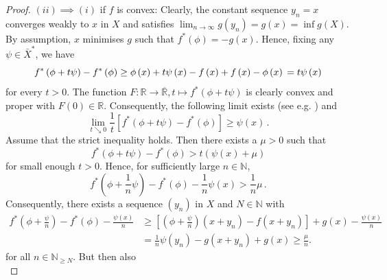 \documentclass[
	paper=A4,
	pagesize=auto,
	fontsize=12pt
]{scrartcl}
\theoremstyle{plain}
\theoremstyle{remark}
\theoremstyle{definition}
\begin{document}
\begin{proof}
$(ii) \implies (i)$ if $f$ is convex:
Clearly, the constant sequence $y_n = x$ converges weakly to $x$ in $X$ and satisfies $\lim_{n \to \infty} g(y_n) = g(x) = \inf g(X)$.
By assumption, $x$ minimises $g$ such that $f^*(\phi) = - g(x)$.
Hence, fixing any $\psi \in \bar{X}^*$, we have
%
\begin{equation}
f^* \left( \phi + t \psi \right) - f^* \left( \phi \right) 
\ge
\phi \left( x \right) + t \psi \left( x \right) - f \left( x \right) + f \left( x \right) - \phi \left( x \right) \\
=
t \psi \left( x \right)
\end{equation} 
%
for every $t>0$.
The function $F : \mathbb{R} \to \overline{\mathbb{R}}, t \mapsto f^* \left( \phi + t \psi \right)$ is clearly convex and proper with $F(0) \in \mathbb{R}$.
Consequently, the following limit exists (see e.g. \cite[Theorem 2.1.5(iii)]{src:Zalinescu:ConvexAnalysisInGeneralVectorSpaces}) and
%
\begin{equation}
\lim_{t \searrow 0}\frac{1}{t} \left[ f^* \left( \phi + t \psi \right) - f^* \left( \phi \right) \right] \geq \psi(x) \, .
\end{equation}
%
Assume that the strict inequality holds.
Then there exists a $\mu >0$ such that
%
\begin{equation}
f^* \left( \phi + t \psi \right) - f^*(\phi)
>
t \left( \psi \left( x \right ) + \mu \right)
\end{equation}
%
for small enough $t > 0$.
Hence, for sufficiently large $n \in \mathbb{N}$,
%
\begin{equation}
f^*\left( \phi + \frac{1}{n} \psi \right) - f^* \left( \phi \right) - \frac{1}{n} \psi \left( x \right) 
>
\frac{1}{n} \mu \, .
\end{equation}
%
Consequently, there exists a sequence $(y_n)$ in $X$ and $N \in \mathbb{N}$ with
%
\begin{equation}
\begin{aligned}
f^* \left( \phi+\frac{\psi}{n} \right) - f^* \left( \phi \right) - \frac{\psi \left( x \right)}{n}
&\ge
\left[ \left( \phi+\frac{\psi}{n} \right) \left( x + y_n \right) - f \left( x + y_n \right) \right]
+ g \left( x \right)
- \frac{\psi \left( x \right)}{n} \\
&=
\frac{1}{n} \psi \left( y_n \right) - g \left( x + y_n \right) + g \left( x \right)
\ge
\frac{\mu}{n}.
\end{aligned}
\end{equation}
%
for all $n \in \mathbb{N}_{\ge N}$.
But then also
%
\begin{equation}

\end{equation}
\end{proof}
\end{document}
